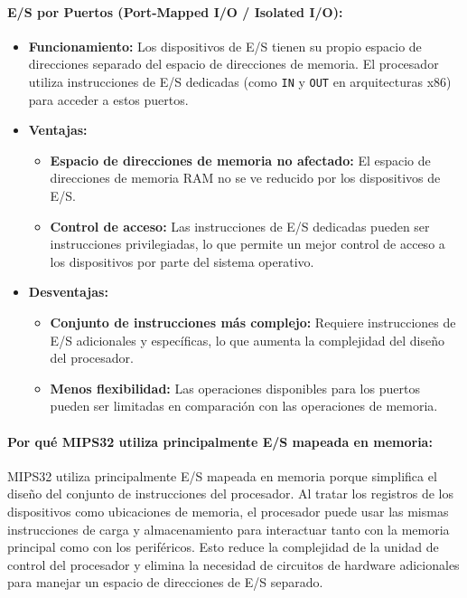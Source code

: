 \documentclass[12pt]{article}
\begin{document}
\paragraph{E/S por Puertos (Port-Mapped I/O / Isolated I/O):}
\begin{itemize}
    \item \textbf{Funcionamiento:} Los dispositivos de E/S tienen su propio espacio de direcciones separado del espacio de direcciones de memoria. El procesador utiliza instrucciones de E/S dedicadas (como \texttt{IN} y \texttt{OUT} en arquitecturas x86) para acceder a estos puertos.
    \item \textbf{Ventajas:}
    \begin{itemize}
        \item \textbf{Espacio de direcciones de memoria no afectado:} El espacio de direcciones de memoria RAM no se ve reducido por los dispositivos de E/S.
        \item \textbf{Control de acceso:} Las instrucciones de E/S dedicadas pueden ser instrucciones privilegiadas, lo que permite un mejor control de acceso a los dispositivos por parte del sistema operativo.
    \end{itemize}
    \item \textbf{Desventajas:}
    \begin{itemize}
        \item \textbf{Conjunto de instrucciones más complejo:} Requiere instrucciones de E/S adicionales y específicas, lo que aumenta la complejidad del diseño del procesador.
        \item \textbf{Menos flexibilidad:} Las operaciones disponibles para los puertos pueden ser limitadas en comparación con las operaciones de memoria.
    \end{itemize}
\end{itemize}

\paragraph{Por qué MIPS32 utiliza principalmente E/S mapeada en memoria:}
MIPS32 utiliza principalmente E/S mapeada en memoria porque simplifica el diseño del conjunto de instrucciones del procesador. Al tratar los registros de los dispositivos como ubicaciones de memoria, el procesador puede usar las mismas instrucciones de carga y almacenamiento para interactuar tanto con la memoria principal como con los periféricos. Esto reduce la complejidad de la unidad de control del procesador y elimina la necesidad de circuitos de hardware adicionales para manejar un espacio de direcciones de E/S separado.
\end{document}
